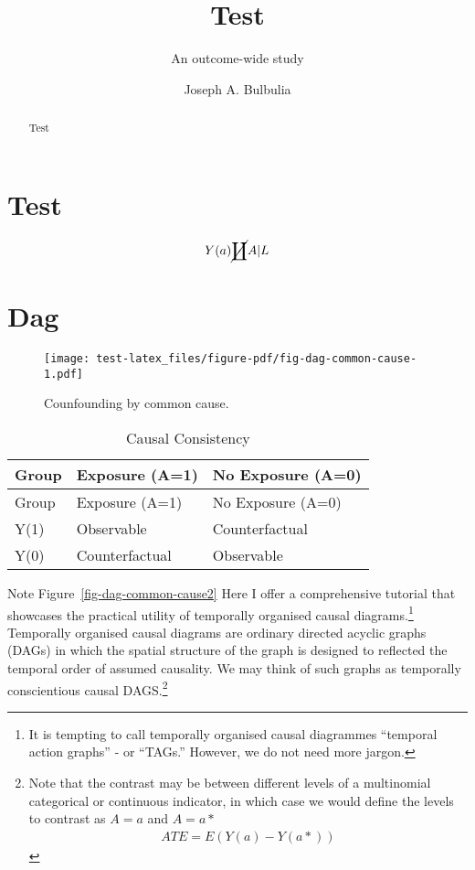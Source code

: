 \documentclass[
  singlecolumn]{report}
\title{Test}
\subtitle{An outcome-wide study}
\author{Joseph A. Bulbulia}
\date{}
\begin{document}
\maketitle
\begin{abstract}
Test
\end{abstract}
\ifdefined\Shaded\renewenvironment{Shaded}{\begin{tcolorbox}[frame hidden, interior hidden, boxrule=0pt, sharp corners, breakable, borderline west={3pt}{0pt}{shadecolor}, enhanced]}{\end{tcolorbox}}\fi

\listoffigures
\listoftables
\hypertarget{test}{%
\section{Test}\label{test}}

\[Y(a)\cancel{\coprod} A|L\]

\hypertarget{dag}{%
\section{Dag}\label{dag}}

\begin{figure}

{\centering \texttt{[image: test-latex\_files/figure-pdf/fig-dag-common-cause-1.pdf]}

}

\caption{\label{fig-dag-common-cause}Counfounding by common cause.}

\end{figure}

\hypertarget{tbl-consistency}{}
\begin{longtable}[]{@{}lll@{}}
\caption{\label{tbl-consistency}Causal Consistency}\tabularnewline
\toprule\noalign{}
Group & Exposure (A=1) & No Exposure (A=0) \\
\midrule\noalign{}
\endfirsthead
\toprule\noalign{}
Group & Exposure (A=1) & No Exposure (A=0) \\
\midrule\noalign{}
\endhead
\bottomrule\noalign{}
\endlastfoot
Y(1) & Observable & Counterfactual \\
Y(0) & Counterfactual & Observable \\
\end{longtable}

Note Figure~\ref{fig-dag-common-cause2} Here I offer a comprehensive
tutorial that showcases the practical utility of temporally organised
causal diagrams.\footnote{It is tempting to call temporally organised
  causal diagrammes ``temporal action graphs'' - or ``TAGs.'' However,
  we do not need more jargon.} Temporally organised causal diagrams are
ordinary directed acyclic graphs (DAGs) in which the spatial structure
of the graph is designed to reflected the temporal order of assumed
causality. We may think of such graphs as temporally conscientious
causal DAGS.\footnote{Note that the contrast may be between different
  levels of a multinomial categorical or continuous indicator, in which
  case we would define the levels to contrast as \(A = a\) and
  \(A = a*\) \begin{align}
  ATE = E(Y(a) - Y(a*))
  \end{align}}
\end{document}

